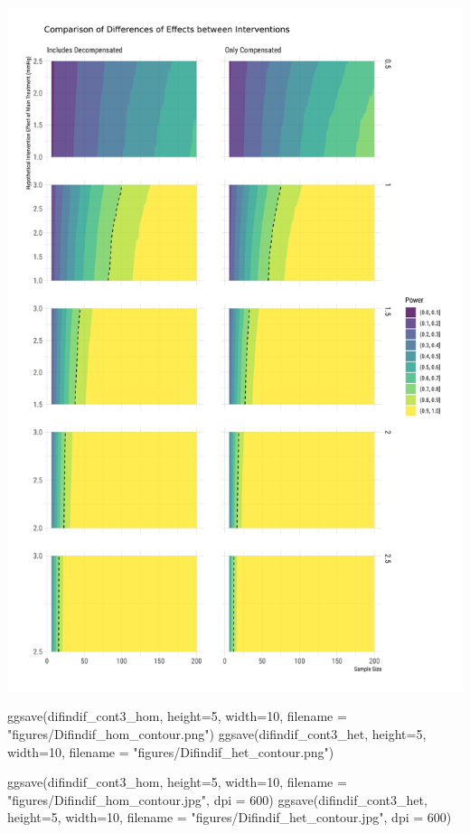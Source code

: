 \documentclass[
]{article}
\newenvironment{Shaded}{\begin{snugshade}}{\end{snugshade}}
\newcommand{\AttributeTok}[1]{\textcolor[rgb]{0.77,0.63,0.00}{#1}}
\newcommand{\DecValTok}[1]{\textcolor[rgb]{0.00,0.00,0.81}{#1}}
\newcommand{\FunctionTok}[1]{\textcolor[rgb]{0.00,0.00,0.00}{#1}}
\newcommand{\NormalTok}[1]{#1}
\newcommand{\StringTok}[1]{\textcolor[rgb]{0.31,0.60,0.02}{#1}}
\begin{document}
\includegraphics{figures/unnamed-chunk-78-2.png}

\begin{Shaded}
\begin{Highlighting}[]
\FunctionTok{ggsave}\NormalTok{(difindif\_cont3\_hom, }\AttributeTok{height=}\DecValTok{5}\NormalTok{, }\AttributeTok{width=}\DecValTok{10}\NormalTok{, }\AttributeTok{filename =} \StringTok{"figures/Difindif\_hom\_contour.png"}\NormalTok{)}
\FunctionTok{ggsave}\NormalTok{(difindif\_cont3\_het, }\AttributeTok{height=}\DecValTok{5}\NormalTok{, }\AttributeTok{width=}\DecValTok{10}\NormalTok{, }\AttributeTok{filename =} \StringTok{"figures/Difindif\_het\_contour.png"}\NormalTok{)}

\FunctionTok{ggsave}\NormalTok{(difindif\_cont3\_hom, }\AttributeTok{height=}\DecValTok{5}\NormalTok{, }\AttributeTok{width=}\DecValTok{10}\NormalTok{, }\AttributeTok{filename =} \StringTok{"figures/Difindif\_hom\_contour.jpg"}\NormalTok{, }
       \AttributeTok{dpi =} \DecValTok{600}\NormalTok{)}
\FunctionTok{ggsave}\NormalTok{(difindif\_cont3\_het, }\AttributeTok{height=}\DecValTok{5}\NormalTok{, }\AttributeTok{width=}\DecValTok{10}\NormalTok{, }\AttributeTok{filename =} \StringTok{"figures/Difindif\_het\_contour.jpg"}\NormalTok{, }
       \AttributeTok{dpi =} \DecValTok{600}\NormalTok{)}
\end{Highlighting}
\end{Shaded}
\end{document}
